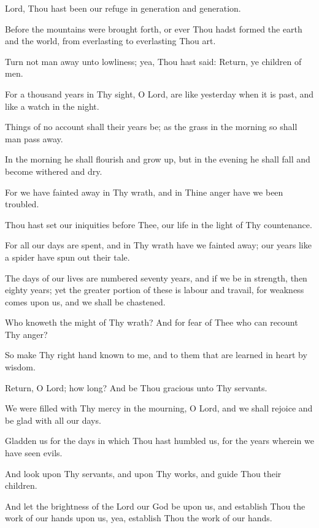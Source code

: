 Lord, Thou hast been our refuge in generation and generation.

Before the mountains were brought forth, or ever Thou hadst formed the earth and the world, from everlasting to everlasting Thou art.

Turn not man away unto lowliness; yea, Thou hast said: Return, ye children of men.

For a thousand years in Thy sight, O Lord, are like yesterday when it is past, and like a watch in the night.

Things of no account shall their years be; as the grass in the morning so shall man pass away.

In the morning he shall flourish and grow up, but in the evening he shall fall and become withered and dry.

For we have fainted away in Thy wrath, and in Thine anger have we been troubled.

Thou hast set our iniquities before Thee, our life in the light of Thy countenance.

For all our days are spent, and in Thy wrath have we fainted away; our years like a spider have spun out their tale.

The days of our lives are numbered seventy years, and if we be in strength, then eighty years; yet the greater portion of these is labour and travail, for weakness comes upon us, and we shall be chastened.

Who knoweth the might of Thy wrath? And for fear of Thee who can recount Thy anger?

So make Thy right hand known to me, and to them that are learned in heart by wisdom.

Return, O Lord; how long? And be Thou gracious unto Thy servants.

We were filled with Thy mercy in the mourning, O Lord, and we shall rejoice and be glad with all our days.

Gladden us for the days in which Thou hast humbled us, for the years wherein we have seen evils.

And look upon Thy servants, and upon Thy works, and guide Thou their children.

And let the brightness of the Lord our God be upon us, and establish Thou the work of our hands upon us, yea, establish Thou the work of our hands.
